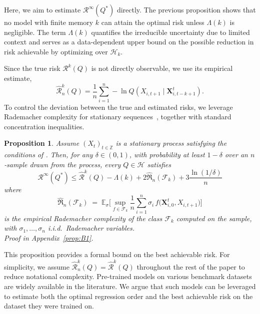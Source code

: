 \documentclass{article}
\newtheorem{proposition}[theorem]{Proposition}
\begin{document}
Here, we aim to estimate $\mathcal{R}^{\infty}(Q^{*})$ directly. The previous proposition shows that no model with finite memory $k$ can attain the optimal risk unless $\Lambda(k)$ is negligible. The term $\Lambda(k)$ quantifies the irreducible uncertainty due to limited context and serves as a data-dependent upper bound on the possible reduction in risk achievable by optimizing over $\mathcal{H}_k$.

Since the true risk $\mathcal{R}^{k}(Q)$ is not directly observable, we use its empirical estimate,
\begin{equation}
\hat{\mathcal{R}}^{k}_{n}(Q) = \frac{1}{n} \sum_{i=1}^n -\ln Q\left(X_{i,t+1} \mid \mathbf{X}_{i,t-k+1}^{t}\right).
\end{equation}
To control the deviation between the true and estimated risks, we leverage Rademacher complexity for stationary sequences~\cite{mcdonald2011rademacher}, together with standard concentration inequalities.


\begin{proposition}
Assume $(X_t)_{t\in\mathbb{Z}}$ is a stationary process satisfying the conditions of \cite{mcdonald2011rademacher}. Then, for any $\delta\in(0,1)$, with probability at least $1-\delta$ over an $n$‑sample drawn from the process, every $Q\in\mathcal{H}$ satisfies
\begin{equation*}
    \mathcal{R}^{\infty}(Q^{*})  \leq \hat{\mathcal{R}}^{k}(Q)-\Lambda(k)+2 \widehat{\Re}_n\left(\mathcal{F}_k\right)+3 \frac{\ln (1 / \delta)}{n}
\end{equation*}
where 
\[
    \widehat{\Re}_n(\mathcal{F}_k)
    \;=\;
    \mathbb{E}_{\sigma}\!\Biggl[\sup_{f\in\mathcal{F}_k}
    \frac{1}{n}\sum_{i=1}^n \sigma_i\,f\bigl(\mathbf{X}_{i,0}^t,X_{i,t+1}\bigr)\Biggr]
\]
is the empirical Rademacher complexity of the class $\mathcal{F}_k$ computed on the sample, with $\sigma_1,\dots,\sigma_n$ i.i.d.\ Rademacher variables.\\
\textit{Proof in Appendix~\ref{prop:B1}.}
\end{proposition}

This proposition provides a formal bound on the best achievable risk. For simplicity, we assume $\hat{\mathcal{R}}^{k}_{n}(Q) = \hat{\mathcal{R}}^{k}(Q)$ throughout the rest of the paper to reduce notational complexity. Pre-trained models on various benchmark datasets are widely available in the literature. We argue that such models can be leveraged to estimate both the optimal regression order and the best achievable risk on the dataset they were trained on.
\end{document}
